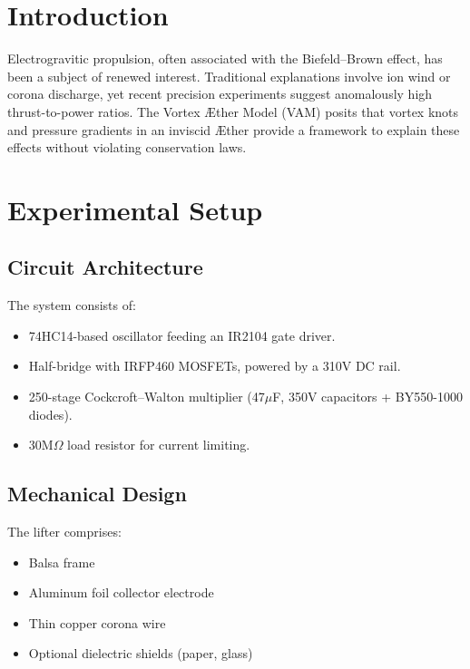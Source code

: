 \documentclass[a4paper,12pt]{article}
\begin{document}
\section{Introduction}
Electrogravitic propulsion, often associated with the Biefeld–Brown effect, has been a subject of renewed interest. Traditional explanations involve ion wind or corona discharge, yet recent precision experiments suggest anomalously high thrust-to-power ratios. The Vortex Æther Model (VAM) posits that vortex knots and pressure gradients in an inviscid Æther provide a framework to explain these effects without violating conservation laws.

\section{Experimental Setup}
\subsection{Circuit Architecture}
The system consists of:
\begin{itemize}
    \item 74HC14-based oscillator feeding an IR2104 gate driver.
    \item Half-bridge with IRFP460 MOSFETs, powered by a 310V DC rail.
    \item 250-stage Cockcroft–Walton multiplier (47$\mu$F, 350V capacitors + BY550-1000 diodes).
    \item 30M$\Omega$ load resistor for current limiting.
\end{itemize}


\subsection{Mechanical Design}
The lifter comprises:
\begin{itemize}
    \item Balsa frame
    \item Aluminum foil collector electrode
    \item Thin copper corona wire
    \item Optional dielectric shields (paper, glass)
\end{itemize}
\end{document}
